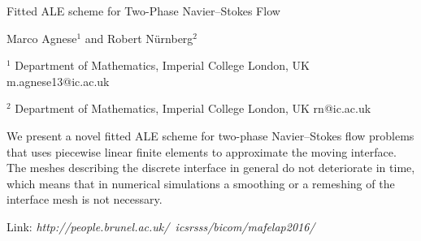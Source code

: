 \documentclass[12pt]{article}
\begin{document}
Fitted ALE scheme for Two-Phase Navier--Stokes Flow

Marco Agnese$^1$   %
and
Robert N\"urnberg$^2$

$^1$ Department of Mathematics, Imperial College London, UK
m.agnese13@ic.ac.uk

$^2$ Department of Mathematics, Imperial College London, UK
rn@ic.ac.uk

\vspace{4mm}

\noindent%
We present a novel fitted ALE scheme for two-phase Navier--Stokes flow problems
that uses piecewise linear finite elements to approximate the moving interface.
The meshes describing the discrete interface in general do not deteriorate in
time, which means that in numerical simulations a smoothing or a remeshing of
the interface mesh is not necessary.

Link: \emph{http://people.brunel.ac.uk/~icsrsss/bicom/mafelap2016/}
\end{document}

